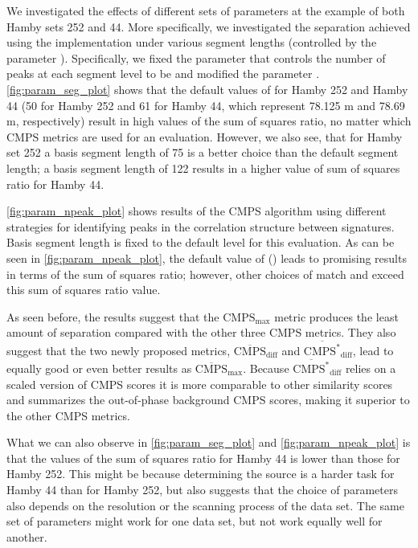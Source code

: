 We investigated the effects of different sets of parameters at the
example of both Hamby sets 252 and 44. More specifically, we
investigated the separation achieved using the 
implementation under various segment lengths (controlled by the
parameter ). Specifically, we fixed the parameter
 that controls the number of peaks at each segment
level to be  and modified the parameter
. \autoref{fig:param_seg_plot} shows that the default
values of  for Hamby 252 and Hamby 44 (50 for Hamby
252 and 61 for Hamby 44, which represent 78.125 \textmu m and 78.69
\textmu m, respectively) result in high values of the sum of squares
ratio, no matter which CMPS metrics are used for an evaluation. However,
we also see, that for Hamby set 252 a basis segment length of 75 is a
better choice than the default segment length; a basis segment length of
122 results in a higher value of sum of squares ratio for Hamby 44.

\autoref{fig:param_npeak_plot} shows results of the CMPS algorithm using
different strategies for identifying peaks in the correlation structure
between signatures. Basis segment length is fixed to the default level
for this evaluation. As can be seen in \autoref{fig:param_npeak_plot},
the default value of  ()
leads to promising results in terms of the sum of squares ratio;
however, other choices of  match and exceed this sum
of squares ratio value.

As seen before, the results suggest that the \(\mathrm{CMPS_{max}}\)
metric produces the least amount of separation compared with the other
three CMPS metrics. They also suggest that the two newly proposed
metrics, \(\mathrm{\overline{CMPS}_{diff}}\) and
\(\mathrm{\overline{CMPS^*}_{diff}}\), lead to equally good or even
better results as \(\mathrm{\overline{CMPS}_{max}}\). Because
\(\mathrm{\overline{CMPS^*}_{diff}}\) relies on a scaled version of CMPS
scores it is more comparable to other similarity scores and summarizes
the out-of-phase background CMPS scores, making it superior to the other
CMPS metrics.

What we can also observe in \autoref{fig:param_seg_plot} and
\autoref{fig:param_npeak_plot} is that the values of the sum of squares
ratio for Hamby 44 is lower than those for Hamby 252. This might be
because determining the source is a harder task for Hamby 44 than for
Hamby 252, but also suggests that the choice of parameters also depends
on the resolution or the scanning process of the data set. The same set
of parameters might work for one data set, but not work equally well for
another.


